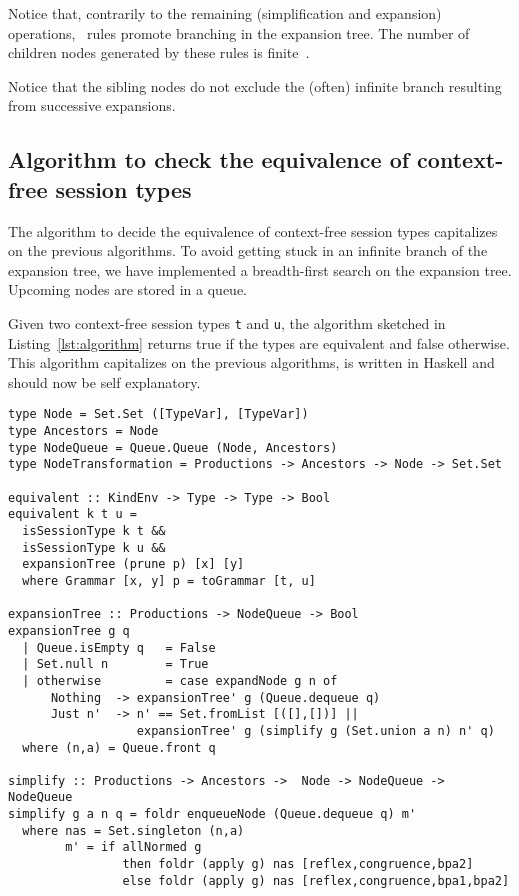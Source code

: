 Notice that, contrarily to the remaining (simplification and expansion) operations, 
\BPA\ rules promote branching in the expansion tree. The number of children nodes 
generated by these rules is finite~\cite{DBLP:journals/iandc/ChristensenHS95}.

Notice that the sibling nodes do not exclude the (often) infinite branch 
resulting from successive expansions.

\subsection{Algorithm to check the equivalence of context-free session types}

The algorithm to decide the equivalence of context-free session 
types capitalizes on the previous algorithms. To avoid getting stuck in an 
infinite branch of the expansion tree, we have implemented 
a breadth-first search on the expansion tree. Upcoming nodes are stored
in a queue.

Given two context-free session types \lstinline|t| and \lstinline|u|,
the algorithm sketched in Listing~\ref{lst:algorithm} returns \textsf{true}
if the types are equivalent and \textsf{false} otherwise. 
This algorithm capitalizes on the previous algorithms, is written in Haskell 
and should now be self explanatory.

\begin{lstlisting}[caption={Algorithm to check the equivalence of context-free session types. Haskell code.},label={lst:algorithm},captionpos=b]
type Node = Set.Set ([TypeVar], [TypeVar])
type Ancestors = Node
type NodeQueue = Queue.Queue (Node, Ancestors)
type NodeTransformation = Productions -> Ancestors -> Node -> Set.Set 

equivalent :: KindEnv -> Type -> Type -> Bool
equivalent k t u =
  isSessionType k t &&
  isSessionType k u &&
  expansionTree (prune p) [x] [y]
  where Grammar [x, y] p = toGrammar [t, u]

expansionTree :: Productions -> NodeQueue -> Bool
expansionTree g q
  | Queue.isEmpty q   = False
  | Set.null n        = True
  | otherwise         = case expandNode g n of
      Nothing  -> expansionTree' g (Queue.dequeue q)
      Just n'  -> n' == Set.fromList [([],[])] ||
                  expansionTree' g (simplify g (Set.union a n) n' q)
  where (n,a) = Queue.front q

simplify :: Productions -> Ancestors ->  Node -> NodeQueue -> NodeQueue
simplify g a n q = foldr enqueueNode (Queue.dequeue q) m'
  where nas = Set.singleton (n,a)
        m' = if allNormed g 
                then foldr (apply g) nas [reflex,congruence,bpa2]
                else foldr (apply g) nas [reflex,congruence,bpa1,bpa2]
\end{lstlisting}

